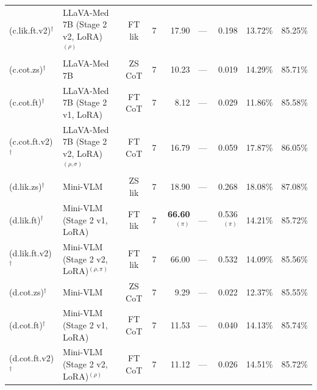 \begin{table}[htbp]
{\begin{tabular}{@{}llccrrrrr@{}}
\rowcolor{thiswork}
(c.lik.ft.v2)$^\dagger$ & LLaVA-Med 7B (Stage 2 v2, LoRA)$^{(\rho)}$
  & FT lik & 7
  & 17.90 & --- & 0.198 & 13.72\% & 85.25\% \\

\rowcolor{thiswork}
(c.cot.zs)$^\dagger$ & LLaVA-Med 7B
  & ZS CoT & 7
  & 10.23 & --- & 0.019 & 14.29\% & 85.71\% \\

\rowcolor{thiswork}
(c.cot.ft)$^\dagger$ & LLaVA-Med 7B (Stage 2 v1, LoRA)
  & FT CoT & 7
  & 8.12 & --- & 0.029 & 11.86\% & 85.58\% \\

\rowcolor{thiswork}
(c.cot.ft.v2)$^\dagger$ & LLaVA-Med 7B (Stage 2 v2, LoRA)$^{(\rho,\sigma)}$
  & FT CoT & 7
  & 16.79 & --- & 0.059 & 17.87\% & 86.05\% \\

\rowcolor{thiswork}
(d.lik.zs)$^\dagger$ & Mini-VLM
  & ZS lik & 7
  & 18.90 & --- & 0.268 & 18.08\% & 87.08\% \\

\rowcolor{thiswork}
(d.lik.ft)$^\dagger$ & Mini-VLM (Stage 2 v1, LoRA)
  & FT lik & 7
  & \textbf{66.60}$^{(\pi)}$ & --- & 0.536$^{(\pi)}$ & 14.21\% & 85.72\% \\

\rowcolor{thiswork}
(d.lik.ft.v2)$^\dagger$ & Mini-VLM (Stage 2 v2, LoRA)$^{(\rho,\pi)}$
  & FT lik & 7
  & 66.00 & --- & 0.532 & 14.09\% & 85.56\% \\

\rowcolor{thiswork}
(d.cot.zs)$^\dagger$ & Mini-VLM
  & ZS CoT & 7
  & 9.29 & --- & 0.022 & 12.37\% & 85.55\% \\

\rowcolor{thiswork}
(d.cot.ft)$^\dagger$ & Mini-VLM (Stage 2 v1, LoRA)
  & FT CoT & 7
  & 11.53 & --- & 0.040 & 14.13\% & 85.74\% \\

\rowcolor{thiswork}
(d.cot.ft.v2)$^\dagger$ & Mini-VLM (Stage 2 v2, LoRA)$^{(\rho)}$
  & FT CoT & 7
  & 11.12 & --- & 0.026 & 14.51\% & 85.72\% \\


\end{tabular}}
\end{table}
